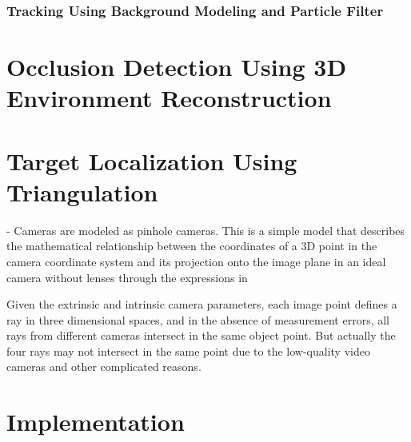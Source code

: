 \subsection{Tracking Using Background Modeling and Particle Filter}
 
\vata[18]
 
\chapter{Occlusion Detection Using 3D Environment Reconstruction}

\vata[23]

\chapter{Target Localization Using Triangulation}


- Cameras are modeled as pinhole cameras. This is a simple model that describes the mathematical
relationship between the coordinates of a 3D point in the camera coordinate system and its
projection onto the image plane in an ideal camera without lenses through the expressions in 


 Given  the  extrinsic  and  intrinsic  camera 
 parameters,  each  image  point  defines  a  ray  in  three 
 dimensional spaces, and in the absence of measurement errors, 
 all  rays  from  different  cameras  intersect  in  the  same  object 
 point. But actually the four rays may not intersect in the same 
 point  due  to  the  low-quality  video  cameras  and  other 
 complicated  reasons.
 
 \vata[28]

\chapter{Implementation} \label{txt:implementation}

